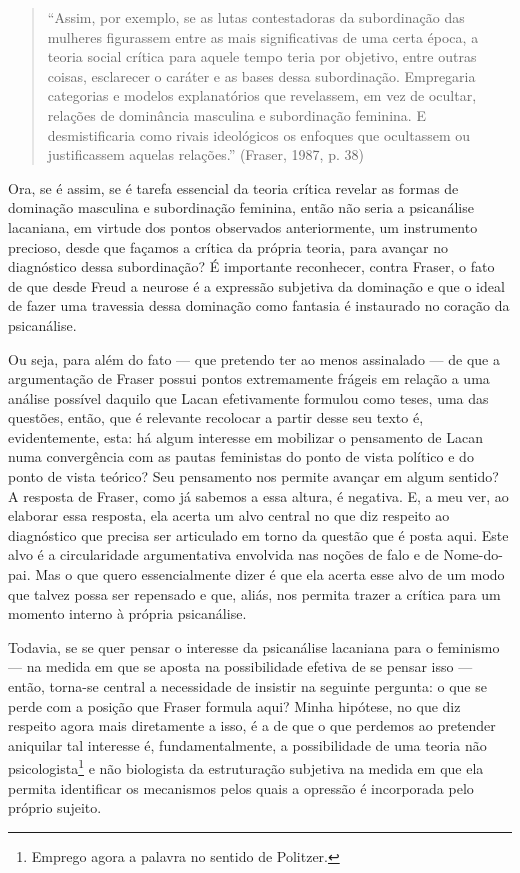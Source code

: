 \begin{quote}
``Assim, por exemplo, se as lutas contestadoras da subordinação das
mulheres figurassem entre as mais significativas de uma certa época, a
teoria social crítica para aquele tempo teria por objetivo, entre outras
coisas, esclarecer o caráter e as bases dessa subordinação. Empregaria
categorias e modelos explanatórios que revelassem, em vez de ocultar,
relações de dominância masculina e subordinação feminina. E
desmistificaria como rivais ideológicos os enfoques que ocultassem ou
justificassem aquelas relações.'' (Fraser, 1987, p. 38)
\end{quote}

Ora, se é assim, se é tarefa essencial da teoria crítica revelar as
formas de dominação masculina e subordinação feminina, então não seria a
psicanálise lacaniana, em virtude dos pontos observados anteriormente,
um instrumento precioso, desde que façamos a crítica da própria teoria,
para avançar no diagnóstico dessa subordinação? É importante reconhecer,
contra Fraser, o fato de que desde Freud a neurose é a expressão
subjetiva da dominação e que o ideal de fazer uma travessia dessa
dominação como fantasia é instaurado no coração da psicanálise.

Ou seja, para além do fato --- que pretendo ter ao menos assinalado --- de
que a argumentação de Fraser possui pontos extremamente frágeis em
relação a uma análise possível daquilo que Lacan efetivamente formulou
como teses, uma das questões, então, que é relevante recolocar a partir
desse seu texto é, evidentemente, esta: há algum interesse em mobilizar
o pensamento de Lacan numa convergência com as pautas feministas do
ponto de vista político e do ponto de vista teórico? Seu pensamento nos
permite avançar em algum sentido? A resposta de Fraser, como já sabemos
a essa altura, é negativa. E, a meu ver, ao elaborar essa resposta, ela
acerta um alvo central no que diz respeito ao diagnóstico que precisa
ser articulado em torno da questão que é posta aqui. Este alvo é a
circularidade argumentativa envolvida nas noções de falo e de
Nome-do-pai. Mas o que quero essencialmente dizer é que ela acerta esse
alvo de um modo que talvez possa ser repensado e que, aliás, nos permita
trazer a crítica para um momento interno à própria psicanálise.

Todavia, se se quer pensar o interesse da psicanálise lacaniana para o
feminismo --- na medida em que se aposta na possibilidade efetiva de se
pensar isso --- então, torna-se central a necessidade de insistir na
seguinte pergunta: o que se perde com a posição que Fraser formula aqui?
Minha hipótese, no que diz respeito agora mais diretamente a isso, é a
de que o que perdemos ao pretender aniquilar tal interesse é,
fundamentalmente, a possibilidade de uma teoria não
psicologista\footnote{Emprego agora a palavra no sentido de Politzer.} e
não biologista da estruturação subjetiva na medida em que ela permita
identificar os mecanismos pelos quais a opressão é incorporada pelo
próprio sujeito.

